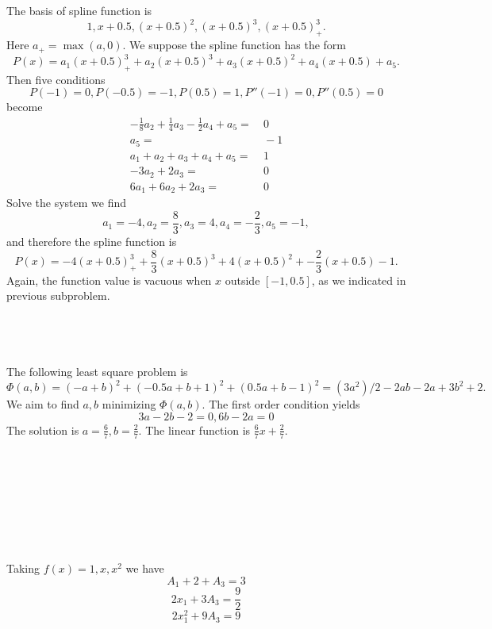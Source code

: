 \documentclass{article}
\begin{document}
\subsection{~}

The basis of spline function is 
$$1, x+0.5, (x+0.5)^2, (x+0.5)^3, (x+0.5)_+^3.$$
Here $a_+ =\max(a,0)$.
We suppose the spline function has the form 
$$P(x) = a_1(x+0.5)_+^3 + a_2(x+0.5)^3 + a_3(x+0.5)^2 + a_4(x+0.5) + a_5.$$
Then five conditions 
$$P(-1) = 0, P(-0.5) = -1, P(0.5)=1, P''(-1) = 0, P''(0.5) = 0$$ become
\begin{align}
-\frac 18 a_2 + \frac 14 a_3 - \frac 12 a_4 + a_5 =&~ 0\\
a_5 =&~-1\\
a_1 + a_2 + a_3 + a_4 + a_5 =&~1\\
-3a_2 + 2a_3 =&~0\\
6a_1 + 6a_2 + 2a_3 =&~0
\end{align}
Solve the system we find 
$$a_1 = -4, a_2 = \frac 83, a_3 = 4, a_4 = -\frac 23, a_5 = -1,$$
and therefore the spline function is 
$$P(x) = -4(x+0.5)_+^3 + \frac 83(x+0.5)^3 + 4(x+0.5)^2 + -\frac 23(x+0.5) -1 .$$
Again, the function value is vacuous when $x$ outside $[-1,0.5]$, as we indicated in previous subproblem.
\subsection{~}

The following least square problem is
$$\Phi(a,b) = (-a+b)^2 + (-0.5a+b+1)^2 + (0.5a+b-1)^2 = (3a^2)/2 - 2ab - 2a + 3b^2 + 2.$$
We aim to find $a,b$ minimizing $\Phi(a,b)$. 
The first order condition yields
$$3a-2b-2=0, 6b-2a=0$$
The solution is $a = \frac 67, b = \frac 27$. The linear function is $\frac 67 x + \frac 27$.

\section{~}
\subsection{~}
Taking $f(x) = 1, x, x^2$ we have 
\begin{equation}
\label{1}
A_1 + 2 + A_3 = 3 
\end{equation}
\begin{equation}
\label{x}
2x_1 + 3A_3 = \frac 92
\end{equation}
\begin{equation}
\label{x2}
2x_1^2 + 9A_3 = 9
\end{equation}
\end{document}
